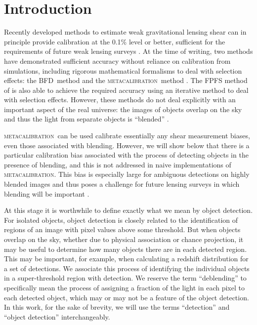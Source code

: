 \documentclass[draft, iop, twocolappendix, appendixfloats, numberedappendix, apj]{hackemulateapj}
\newcommand{\mcal}{\textsc{metacalibration}}
\newcommand{\bfd}{\textsc{BFD}}
\begin{document}
\section{Introduction} \label{sec:intro}

Recently developed methods to estimate weak gravitational lensing shear can in
principle provide calibration at the 0.1\% level or better, sufficient for the
requirements of future weak lensing surveys \citep[e.g.,][]{huterer2006}.  At
the time of writing, two methods have demonstrated sufficient accuracy without
reliance on calibration from simulations, including rigorous mathematical
formalisms to deal with selection effects:  the \bfd\ method
\citep{BernBFD2016} and the \mcal\ method \citep{HuffMcal2017,SheldonMcal2017}.
The FPFS method of \cite{FPFS2018} is also able to achieve the required
accuracy using an iterative method to deal with selection effects.  However,
these methods do not deal explicitly with an important aspect of the real
universe: the images of objects overlap on the sky and thus the light from
separate objects is ``blended'' \citep[for discussion of blending
effects see, e.g.,][]{DawsonBlending2016}.

\mcal\ can be used calibrate essentially any shear measurement biases, even
those associated with blending.  However, we will show below that there is a
particular calibration bias associated with the process of detecting objects in
the presence of blending, and this is not addressed in naive implementations of
\mcal. This bias is especially large for ambiguous detections on highly blended
images and thus poses a challenge for future lensing surveys in which blending
will be important \citep{DawsonBlending2016}.

At this stage it is worthwhile to define exactly what we mean by object
detection.  For isolated objects, object detection is closely related to the
identification of regions of an image with pixel values above some threshold.
But when objects overlap on the sky, whether due to physical association or
chance projection, it may be useful to determine how many objects there are in
each detected region. This may be important, for example, when calculating a
redshift distribution for a set of detections.  We associate this process of
identifying the individual objects in a super-threshold region with detection.
We reserve the term ``deblending'' to specifically mean the process of
assigning a fraction of the light in each pixel to each detected object, which
may or may not be a feature of the object detection.  In this work, for the
sake of brevity, we will use the terms ``detection'' and ``object detection''
interchangeably.
\end{document}
